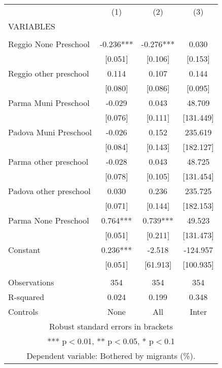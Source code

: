 \begin{tabular}{lccc} \hline
 & (1) & (2) & (3) \\
VARIABLES &  &  &  \\ \hline
 &  &  &  \\
Reggio None Preschool & -0.236*** & -0.276*** & 0.030 \\
 & [0.051] & [0.106] & [0.153] \\
Reggio other preschool & 0.114 & 0.107 & 0.144 \\
 & [0.080] & [0.086] & [0.095] \\
Parma Muni Preschool & -0.029 & 0.043 & 48.709 \\
 & [0.076] & [0.111] & [131.449] \\
Padova Muni Preschool & -0.026 & 0.152 & 235.619 \\
 & [0.084] & [0.143] & [182.127] \\
Parma other preschool & -0.028 & 0.043 & 48.725 \\
 & [0.078] & [0.105] & [131.454] \\
Padova other preschool & 0.030 & 0.236 & 235.725 \\
 & [0.071] & [0.144] & [182.153] \\
Parma None Preschool & 0.764*** & 0.739*** & 49.523 \\
 & [0.051] & [0.211] & [131.473] \\
Constant & 0.236*** & -2.518 & -124.957 \\
 & [0.051] & [61.913] & [100.935] \\
 &  &  &  \\
Observations & 354 & 354 & 354 \\
R-squared & 0.024 & 0.199 & 0.348 \\
 Controls & None & All & Inter \\ \hline
\multicolumn{4}{c}{ Robust standard errors in brackets} \\
\multicolumn{4}{c}{ *** p$<$0.01, ** p$<$0.05, * p$<$0.1} \\
\multicolumn{4}{c}{ Dependent variable: Bothered by migrants (\%).} \\
\end{tabular}
